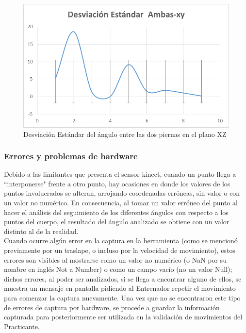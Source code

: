 \begin{figure}[H]%
	\begin{center}
		\includegraphics[scale=0.70]{./Figuras/Implementacion/Senkuntsudachi_Izquierda_DesvEst_Ambas_xy}
	\end{center}
	\caption{Desviación Estándar del ángulo entre las dos piernas en el plano XZ}
	\label{fig:Senkuntsudachi_Izquierda_DesvEst_Ambas_xy}
\end{figure}

\subsubsection{Errores y problemas de hardware}
Debido a las limitantes que presenta el sensor kinect,  cuando un punto llega a ``interponerse" frente a otro punto, hay ocasiones en donde los valores de los puntos involucrados se alteran, arrojando coordenadas erróneas, sin valor o con un valor no numérico. En consecuencia, al tomar un valor erróneo del punto al hacer el análisis del seguimiento de los diferentes ángulos con respecto a los puntos del cuerpo, el resultado del ángulo analizado se obtiene con un valor distinto al de la realidad.\\

Cuando ocurre algún error en la captura en la herramienta (como se mencionó previamente por un traslape, o incluso por la velocidad de movimiento), estos errores son visibles al mostrarse como un valor no numérico (o NaN por su nombre en inglés Not a Number) o como un campo vacío (no un valor Null); dichos errores, al poder ser analizados, si se llega a encontrar alguno de ellos, se muestra un mensaje en pantalla pidiendo al Entrenador repetir el movimiento para comenzar la captura nuevamente. Una vez que no se encontraron este tipo de errores de captura por hardware, se procede a guardar la información capturada para posteriormente ser utilizada en la validación de movimientos del Practicante.\\

